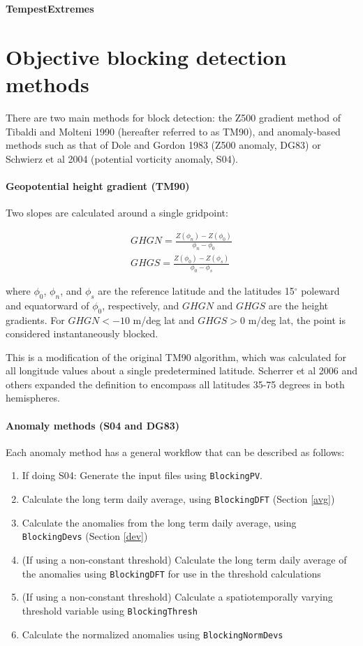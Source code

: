 \documentclass{article}
\begin{document}
{\Huge \textbf{TempestExtremes}}


\tableofcontents

\section{Objective blocking detection methods}

There are two main methods for block detection: the Z500 gradient method of Tibaldi and Molteni 1990 (hereafter referred to as TM90), and anomaly-based methods such as that of Dole and Gordon 1983 (Z500 anomaly, DG83) or Schwierz et al 2004 (potential vorticity anomaly, S04). 

\paragraph{Geopotential height gradient (TM90)} Two slopes are calculated around a single gridpoint:

\begin{eqnarray}
GHGN=\frac{Z(\phi_n)-Z(\phi_0)}{\phi_n-\phi_0}\\
GHGS=\frac{Z(\phi_0)-Z(\phi_s)}{\phi_0-\phi_s}
\end{eqnarray}

\noindent where $\phi_0$, $\phi_n$, and $\phi_s$ are the reference latitude and the latitudes 15$^\circ$ poleward and equatorward of $\phi_0$, respectively, and $GHGN$ and $GHGS$ are the height gradients. For $GHGN<-10$ m/deg lat and $GHGS>0$ m/deg lat, the point is considered instantaneously blocked.

This is a modification of the original TM90 algorithm, which was calculated for all longitude values about a single predetermined latitude. Scherrer et al 2006 and others expanded the definition to encompass all latitudes 35-75 degrees in both hemispheres.


\paragraph{Anomaly methods (S04 and DG83)} Each anomaly method has a general workflow that can be described as follows:

\begin{enumerate}
\item If doing S04: Generate the input files using \texttt{BlockingPV}.
\item Calculate the long term daily average, using \texttt{BlockingDFT} (Section \ref{avg})
\item Calculate the anomalies from the long term daily average, using \texttt{BlockingDevs} (Section \ref{dev})
\item (If using a non-constant threshold) Calculate the long term daily average of the anomalies using \texttt{BlockingDFT} for use in the threshold calculations
\item (If using a non-constant threshold) Calculate a spatiotemporally varying threshold variable using \texttt{BlockingThresh}
\item Calculate the normalized anomalies using \texttt{BlockingNormDevs}
\end{enumerate}
\end{document}
